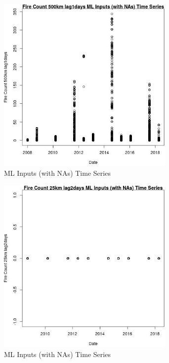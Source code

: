 \begin{figure} 
\centering  
\includegraphics[width=0.77\textwidth]{Code_Outputs/Report_ML_input_PM25_Step4_part_e_de_duplicated_aves_compiled_2019-05-18wNAs_Fire_Count_500km_lag1daysvDate.jpg} 
\caption{\label{fig:Report_ML_input_PM25_Step4_part_e_de_duplicated_aves_compiled_2019-05-18wNAsFire_Count_500km_lag1daysvDate}ML Inputs (with NAs) Time Series} 
\end{figure} 
 

\begin{figure} 
\centering  
\includegraphics[width=0.77\textwidth]{Code_Outputs/Report_ML_input_PM25_Step4_part_e_de_duplicated_aves_compiled_2019-05-18wNAs_Fire_Count_25km_lag2daysvDate.jpg} 
\caption{\label{fig:Report_ML_input_PM25_Step4_part_e_de_duplicated_aves_compiled_2019-05-18wNAsFire_Count_25km_lag2daysvDate}ML Inputs (with NAs) Time Series} 
\end{figure} 
 

